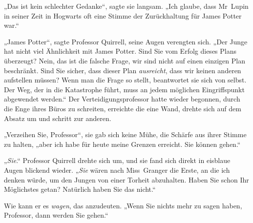 „Das ist kein schlechter Gedanke“, sagte sie langsam.
„Ich glaube, dass Mr~Lupin in seiner Zeit in Hogwarts oft eine Stimme der Zurückhaltung für James Potter war.“

„James Potter“, sagte Professor Quirrell, seine Augen verengten sich.
„Der Junge hat nicht viel Ähnlichkeit mit James Potter. Sind Sie vom Erfolg dieses Plans überzeugt? Nein, das ist die falsche Frage, wir sind nicht auf einen einzigen Plan beschränkt. Sind Sie sicher, dass dieser Plan \emph{ausreicht}, dass wir keinen anderen aufstellen müssen? Wenn man die Frage so stellt, beantwortet sie sich von selbst. Der Weg, der in die Katastrophe führt, muss an jedem möglichen Eingriffspunkt abgewendet werden.“ Der Verteidigungsprofessor hatte wieder begonnen, durch die Enge ihres Büros zu schreiten, erreichte die eine Wand, drehte sich auf dem Absatz um und schritt zur anderen.

„Verzeihen Sie, Professor“, sie gab sich keine Mühe, die Schärfe aus ihrer Stimme zu halten, „aber ich habe für heute meine Grenzen erreicht. Sie können gehen.“

„\emph{Sie}.“ Professor Quirrell drehte sich um, und sie fand sich direkt in eisblaue Augen blickend wieder. „\emph{Sie} wären nach Miss~Granger die Erste, an die ich denken würde, um den Jungen von einer Torheit abzuhalten. Haben Sie schon Ihr Möglichstes getan? Natürlich haben Sie das nicht.“

Wie kann er es \emph{wagen}, das anzudeuten.
„Wenn Sie nichts mehr zu sagen haben, Professor, dann werden Sie gehen.“

